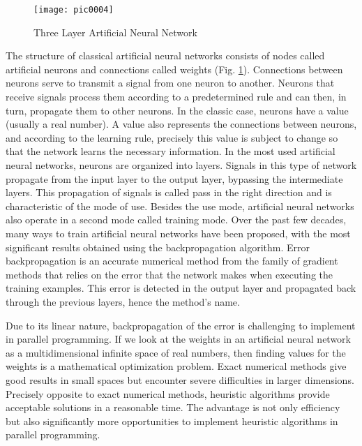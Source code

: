 \begin{figure}[h]
\centering
\texttt{[image: pic0004]}
\caption{Three Layer Artificial Neural Network}
\label{fig:pic0004}
\end{figure}

The structure of classical artificial neural networks consists of nodes called artificial neurons and connections called weights (Fig. \ref{fig:pic0004}). Connections between neurons serve to transmit a signal from one neuron to another. Neurons that receive signals process them according to a predetermined rule and can then, in turn, propagate them to other neurons. In the classic case, neurons have a value (usually a real number). A value also represents the connections between neurons, and according to the learning rule, precisely this value is subject to change so that the network learns the necessary information. In the most used artificial neural networks, neurons are organized into layers. Signals in this type of network propagate from the input layer to the output layer, bypassing the intermediate layers. This propagation of signals is called pass in the right direction and is characteristic of the mode of use. Besides the use mode, artificial neural networks also operate in a second mode called training mode. Over the past few decades, many ways to train artificial neural networks have been proposed, with the most significant results obtained using the backpropagation algorithm. Error backpropagation is an accurate numerical method from the family of gradient methods that relies on the error that the network makes when executing the training examples. This error is detected in the output layer and propagated back through the previous layers, hence the method's name.

Due to its linear nature, backpropagation of the error is challenging to implement in parallel programming. If we look at the weights in an artificial neural network as a multidimensional infinite space of real numbers, then finding values for the weights is a mathematical optimization problem. Exact numerical methods give good results in small spaces but encounter severe difficulties in larger dimensions. Precisely opposite to exact numerical methods, heuristic algorithms provide acceptable solutions in a reasonable time. The advantage is not only efficiency but also significantly more opportunities to implement heuristic algorithms in parallel programming.

